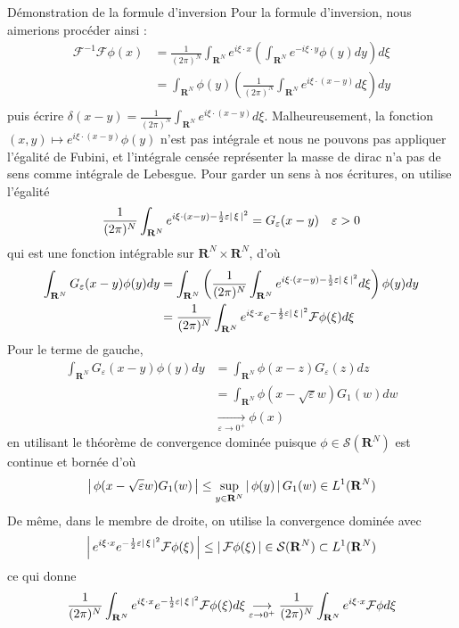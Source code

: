 \begin{demo}{Démonstration de la formule d’inversion}
            Pour la formule d’inversion, nous aimerions procéder ainsi : 
            \begin{align*}
                \mathcal{F}^{-1} \mathcal{F}\phi(x) 
                &= \frac{1}{(2\pi)^N} \int_{\mathbf{R}^N} e^{i \xi \cdot x} \left(\int_{\mathbf{R}^N} e^{- i \xi \cdot y} \phi(y)dy\right) d\xi \\
                &= \int_{\mathbf{R}^N} \phi(y) \left(\frac{1}{(2\pi)^N} \int_{\mathbf{R}^N} e^{i \xi \cdot (x-y)} d\xi \right) dy \\
            \end{align*}
            puis écrire $\delta(x-y) = \frac{1}{(2\pi)^N} \int_{\mathbf{R}^N} e^{i \xi \cdot (x-y)} d\xi$. Malheureusement, la fonction $(x,y) \mapsto e^{i \xi \cdot(x-y)}\phi(y)$ n’est pas intégrale et nous ne pouvons pas appliquer l’égalité de Fubini, et l’intégrale censée représenter la masse de dirac n’a pas de sens comme intégrale de Lebesgue. Pour garder un sens à nos écritures, on utilise l’égalité
            \[ \frac{1}{(2\pi)^N}\int_{\mathbf{R}^N} e^{i \xi \cdot (x-y) - \frac{1}{2}\varepsilon\left\lvert \, \xi \, \right\rvert^2} = G_{\varepsilon}(x-y) \quad \varepsilon > 0\]   
            qui est une fonction intégrable sur $\mathbf{R}^N \times \mathbf{R}^N$, d’où 
            \begin{align*}
                \int_{\mathbf{R}^N} G_{\varepsilon}(x-y)\phi(y)dy 
                &= \int_{\mathbf{R}^N} \left(\frac{1}{(2\pi)^N} \int_{\mathbf{R}^N} e^{i \xi \cdot (x-y) - \frac{1}{2} \varepsilon \left\lvert \, \xi \, \right\rvert^2} d\xi\right) \phi(y) dy \\
                &= \frac{1}{(2\pi)^N} \int_{\mathbf{R}^N} e^{i \xi \cdot x} e^{-\frac{1}{2}\varepsilon\left\lvert \, \xi \, \right\rvert^2} \mathcal{F}\phi(\xi) d\xi
            \end{align*}
            Pour le terme de gauche,
            \begin{align*}
                \int_{\mathbf{R}^N} G_{\varepsilon}(x-y)\phi(y)dy 
                &=\int_{\mathbf{R}^N}\phi(x - z)G_{\varepsilon}(z)dz \\
                &= \int_{\mathbf{R}^N} \phi(x - \sqrt{\varepsilon}w)G_1(w)dw \\
                &\underset{\varepsilon \to 0^+}{\longrightarrow} \phi(x) 
            \end{align*}
            en utilisant le théorème de convergence dominée puisque $\phi \in \mathcal{S}(\mathbf{R}^N)$ est continue et bornée d’où
            \[ \left\lvert \, \phi(x - \sqrt{\varepsilon}w) G_1(w) \, \right\rvert \leq \sup_{y \in \mathbf{R}^N} \left\lvert \, \phi(y) \, \right\rvert G_1(w) \in L^1(\mathbf{R}^N) \]   
            De même, dans le membre de droite, on utilise la convergence dominée avec 
            \[ \left\lvert \, e^{i \xi \cdot x} e^{-\frac{1}{2}\varepsilon\left\lvert \, \xi \, \right\rvert^2} \mathcal{F}\phi(\xi) \, \right\rvert \leq \left\lvert \, \mathcal{F}\phi(\xi) \, \right\rvert \in \mathcal{S}(\mathbf{R}^N) \subset L^1(\mathbf{R}^N) \]
            ce qui donne
            \[ \frac{1}{(2\pi)^N} \int_{\mathbf{R}^N} e^{i \xi \cdot x} e^{-\frac{1}{2}\varepsilon\left\lvert \, \xi \, \right\rvert^2} \mathcal{F}\phi(\xi) d\xi \underset{\varepsilon \to 0^+}{\longrightarrow} \frac{1}{(2\pi)^N} \int_{\mathbf{R}^N} e^{i \xi \cdot x} \mathcal{F}\phi d\xi \]
        \end{demo}

